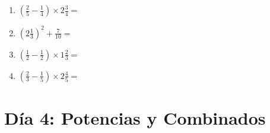 \documentclass[12pt]{article}
\begin{document}
\begin{enumerate}
\item \large $ \left( \frac{2}{5} - \frac{1}{4} \right) \times 2 \frac{3}{4} = $ \vspace{1.6cm}
\item \large $ \left( 2 \frac{1}{3} \right)^2 + \frac{7}{10} = $ \vspace{1.6cm}
\item \large $ \left( \frac{1}{2} - \frac{1}{2} \right) \times 1 \frac{2}{3} = $ \vspace{1.6cm}
\item \large $ \left( \frac{2}{3} - \frac{1}{5} \right) \times 2 \frac{4}{5} = $ \vspace{1.6cm}
\end{enumerate}\newpage
\section*{Día 4: Potencias y Combinados}
\end{document}
